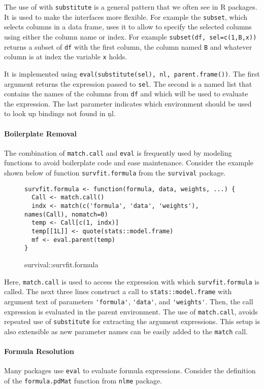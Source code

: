 \documentclass[screen,acmsmall]{acmart}%
\newcommand{\code}[1]{\lstinline |#1|\xspace}
\begin{document}
The use of \eval with \code{substitute} is a general pattern that we often see
in R packages. It is used to make the interfaces more flexible. For example the
\code{subset}, which selects columns in a data frame, uses it to allow to specify
the selected columns using either the column name or index. For example
\code{subset(df, sel=c(1,B,x))} returns a subset of \code{df} with the first
column, the column named \code{B} and whatever column is at index the variable
\code{x} holds.

It is implemented using \code{eval(substitute(sel), nl, parent.frame())}. The
first argument returns the expression passed to \code{sel}. The second is a
named list that contains the names of the columns from \code{df} and which will
be used to evaluate the expression. The last parameter indicates which
environment should be used to look up bindings not found in \c{nl}.

\paragraph{Boilerplate Removal} The combination of \code{match.call} and \code{eval}
is frequently used by modeling functions to avoid boilerplate code and ease
maintenance. Consider the example shown below of function \code{survfit.formula}
from the \code{survival} package.

\begin{figure}[h]
\begin{lstlisting}
survfit.formula <- function(formula, data, weights, ...) {
  Call <- match.call()
  indx <- match(c('formula', 'data', 'weights'), names(Call), nomatch=0)
  temp <- Call[c(1, indx)]
  temp[[1L]] <- quote(stats::model.frame)
  mf <- eval.parent(temp)
}
\end{lstlisting}
  \caption{survival::survfit.formula}
\end{figure}

Here, \code{match.call} is used to access the expression with which
\code{survfit.formula} is called. The next three lines construct a call to
\code{stats::model.frame} with argument text of parameters \code{'formula'},
\code{'data'}, and \code{'weights'}. Then, the call expression is evaluated in
the parent environment. The use of \code{match.call}, avoids repeated use of
\code{substitute} for extracting the argument expressions. This setup is also
extensible as new parameter names can be easily added to the \code{match} call.

\paragraph{Formula Resolution} Many packages use \code{eval} to evaluate formula
expressions. Consider the definition of the \code{formula.pdMat} function from
\code{nlme} package.
\end{document}
